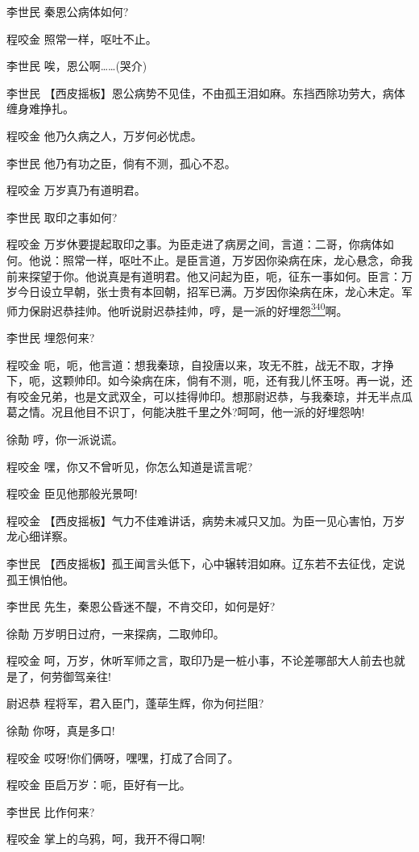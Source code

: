 李世民 秦恩公病体如何?

程咬金 照常一样，呕吐不止。

李世民 唉，恩公啊\ldots{}\ldots{}(哭介)

李世民
【西皮摇板】恩公病势不见佳，不由孤王泪如麻。东挡西除功劳大，病体缠身难挣扎。

程咬金 他乃久病之人，万岁何必忧虑。

李世民 他乃有功之臣，倘有不测，孤心不忍。

程咬金 万岁真乃有道明君。

李世民 取印之事如何?

程咬金
万岁休要提起取印之事。为臣走进了病房之间，言道：二哥，你病体如何。他说：照常一样，呕吐不止。是臣言道，万岁因你染病在床，龙心悬念，命我前来探望于你。他说真是有道明君。他又问起为臣，呃，征东一事如何。臣言：万岁今日设立早朝，张士贵有本回朝，招军已满。万岁因你染病在床，龙心未定。军师力保尉迟恭挂帅。他听说尉迟恭挂帅，哼，是一派的好埋怨\protect\hyperlink{fn340}{\textsuperscript{340}}啊。

李世民 埋怨何来?

程咬金
呃，呃，他言道：想我秦琼，自投唐以来，攻无不胜，战无不取，才挣下，呃，这颗帅印。如今染病在床，倘有不测，呃，还有我儿怀玉呀。再一说，还有咬金兄弟，也是文武双全，可以挂得帅印。想那尉迟恭，与我秦琼，并无半点瓜葛之情。况且他目不识丁，何能决胜千里之外?呵呵，他一派的好埋怨呐!

徐勣 哼，你一派说谎。

程咬金 嘿，你又不曾听见，你怎么知道是谎言呢?

程咬金 臣见他那般光景呵!

程咬金
【西皮摇板】气力不佳难讲话，病势未减只又加。为臣一见心害怕，万岁龙心细详察。

李世民
【西皮摇板】孤王闻言头低下，心中辗转泪如麻。辽东若不去征伐，定说孤王惧怕他。

李世民 先生，秦恩公昏迷不醍，不肯交印，如何是好?

徐勣 万岁明日过府，一来探病，二取帅印。

程咬金
呵，万岁，休听军师之言，取印乃是一桩小事，不论差哪部大人前去也就是了，何劳御驾亲往!

尉迟恭 程将军，君入臣门，蓬荜生辉，你为何拦阻?

徐勣 你呀，真是多口!

程咬金 哎呀!你们俩呀，嘿嘿，打成了合同了。

程咬金 臣启万岁：呃，臣好有一比。

李世民 比作何来?

程咬金 掌上的乌鸦，呵，我开不得口啊!

